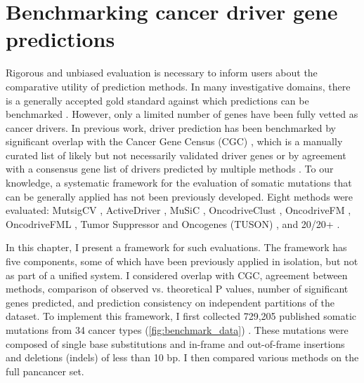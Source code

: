 
\chapter{Benchmarking cancer driver gene predictions}
\label{chap:ch4}

Rigorous and unbiased evaluation is necessary to inform users about the comparative utility of prediction methods. In many investigative domains, there is a generally accepted gold standard against which predictions can be benchmarked \cite{RN102, RN103}. However, only a limited number of genes have been fully vetted as cancer drivers. In previous work, driver prediction has been benchmarked by significant overlap with the Cancer Gene Census (CGC) \cite{RN97}, which is a manually curated list of likely but not necessarily validated driver genes \cite{RN54, RN53} or by agreement with a consensus gene list of drivers predicted by multiple methods \cite{RN96}. To our knowledge, a systematic framework for the evaluation of somatic mutations that can be generally applied has not been previously developed. Eight methods were evaluated: MutsigCV \cite{RN13}, ActiveDriver \cite{RN98}, MuSiC \cite{RN43}, OncodriveClust \cite{RN54}, OncodriveFM \cite{RN53}, OncodriveFML \cite{RN86}, Tumor Suppressor and Oncogenes (TUSON) \cite{RN71}, and 20/20+ \cite{RN70}. 

In this chapter, I present a framework for such evaluations. The framework has five components, some of which have been previously applied in isolation, but not as part of a unified system. I considered overlap with CGC, agreement between methods, comparison of observed vs. theoretical P values, number of significant genes predicted, and prediction consistency on independent partitions of the dataset. To implement this framework, I first collected 729,205 published somatic mutations from 34 cancer types (\autoref{fig:benchmark_data}) \cite{RN14, RN71}. These mutations were composed of single base substitutions and in-frame and out-of-frame insertions and deletions (indels) of less than 10 bp. I then compared various methods on the full pancancer set.

